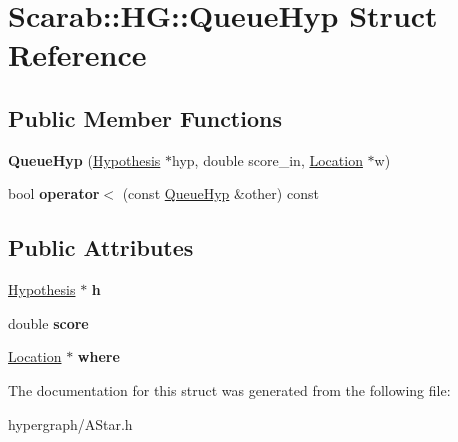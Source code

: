 \hypertarget{struct_scarab_1_1_h_g_1_1_queue_hyp}{
\section{Scarab::HG::QueueHyp Struct Reference}
\label{struct_scarab_1_1_h_g_1_1_queue_hyp}
}
\subsection*{Public Member Functions}
\begin{DoxyCompactItemize}
\item 
\hypertarget{struct_scarab_1_1_h_g_1_1_queue_hyp_a165e60736b23d97bec8cdaff7c742db7}{
{\bfseries QueueHyp} (\hyperlink{struct_scarab_1_1_h_g_1_1_hypothesis}{Hypothesis} $\ast$hyp, double score\_\-in, \hyperlink{struct_scarab_1_1_h_g_1_1_location}{Location} $\ast$w)}
\label{struct_scarab_1_1_h_g_1_1_queue_hyp_a165e60736b23d97bec8cdaff7c742db7}

\item 
\hypertarget{struct_scarab_1_1_h_g_1_1_queue_hyp_aa02f7835d0dd0d00cc5f00ff7430ddf3}{
bool {\bfseries operator$<$} (const \hyperlink{struct_scarab_1_1_h_g_1_1_queue_hyp}{QueueHyp} \&other) const }
\label{struct_scarab_1_1_h_g_1_1_queue_hyp_aa02f7835d0dd0d00cc5f00ff7430ddf3}

\end{DoxyCompactItemize}
\subsection*{Public Attributes}
\begin{DoxyCompactItemize}
\item 
\hypertarget{struct_scarab_1_1_h_g_1_1_queue_hyp_ae3368ba62dae4842a83766b44bcda346}{
\hyperlink{struct_scarab_1_1_h_g_1_1_hypothesis}{Hypothesis} $\ast$ {\bfseries h}}
\label{struct_scarab_1_1_h_g_1_1_queue_hyp_ae3368ba62dae4842a83766b44bcda346}

\item 
\hypertarget{struct_scarab_1_1_h_g_1_1_queue_hyp_ab4c4483fa92ecb415def41f5ed366e53}{
double {\bfseries score}}
\label{struct_scarab_1_1_h_g_1_1_queue_hyp_ab4c4483fa92ecb415def41f5ed366e53}

\item 
\hypertarget{struct_scarab_1_1_h_g_1_1_queue_hyp_ae151535de5fa3bb2cfe44dade082c613}{
\hyperlink{struct_scarab_1_1_h_g_1_1_location}{Location} $\ast$ {\bfseries where}}
\label{struct_scarab_1_1_h_g_1_1_queue_hyp_ae151535de5fa3bb2cfe44dade082c613}

\end{DoxyCompactItemize}


The documentation for this struct was generated from the following file:\begin{DoxyCompactItemize}
\item 
hypergraph/AStar.h\end{DoxyCompactItemize}
